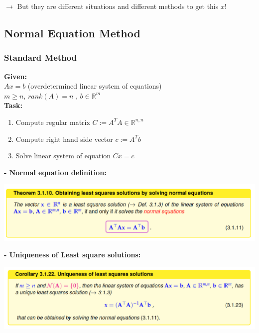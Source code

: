 \documentclass[12pt, a4paper]{article}
\newcommand{\R}{\mathbb{R}}
\begin{document}
$\rightarrow$ But they are different situations and different methods to get this $x$!


\subsection{Normal Equation Method}

\subsubsection{Standard Method}

\begin{tcolorbox}
\textbf{Given:}\\
$Ax = b$ (overdetermined linear system of equations) \\
$m \geq n$, $rank(A)=n$ ,  $b \in \R^{m}$\vspace{2mm}\\
\textbf{Task:} \vspace{-2mm}
\begin{enumerate}[noitemsep]
	\item Compute regular matrix $C := A^TA \in \R^{n,n}$
	\item Compute right hand side vector $c := A^Tb$
	\item Solve linear system of equation $Cx = c$
\end{enumerate}
\end{tcolorbox}

\textbf{- Normal equation definition:}
\begin{center}
	\includegraphics[width=380pt]{normalEquationDef.png}
\end{center}

\textbf{- Uniqueness of Least square solutions:}
\begin{center}
	\includegraphics[width=380pt]{normalEquationUniqueness.png}
\end{center}
\end{document}
